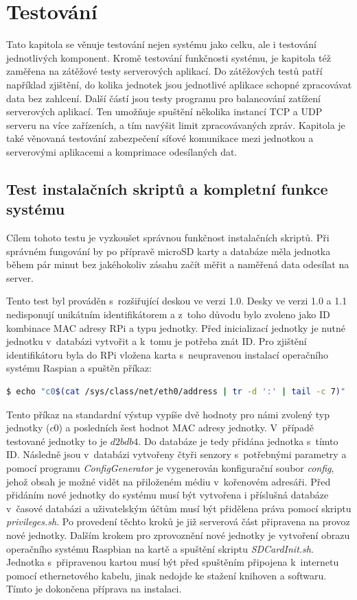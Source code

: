 \chapter{Testování}\label{kap:test}
Tato kapitola se věnuje testování nejen systému jako celku, ale i testování jednotlivých komponent. Kromě testování funkčnosti systému, je kapitola též zaměřena na zátěžové testy serverových aplikací. Do zátěžových testů patří například zjištění, do kolika jednotek jsou jednotlivé aplikace schopné zpracovávat data bez zahlcení. Další částí jsou testy programu pro balancování zatížení serverových aplikací. Ten umožňuje spuštění několika instancí TCP a UDP serveru na více zařízeních, a tím navýšit limit zpracovávaných zpráv. Kapitola je také věnovaná testování zabezpečení síťové komunikace mezi jednotkou a serverovými aplikacemi a komprimace odesílaných dat.

\section{Test instalačních skriptů a kompletní funkce systému}
Cílem tohoto testu je vyzkoušet správnou funkčnost instalačních skriptů. Při správném fungování by po přípravě microSD karty a databáze měla jednotka během pár minut bez jakéhokoliv zásahu začít měřit a naměřená data odesílat na server.

Tento test byl prováděn s~rozšiřující deskou ve verzi 1.0. Desky ve verzi 1.0 a 1.1 nedisponují unikátním identifikátorem a z~toho důvodu bylo zvoleno jako ID kombinace MAC adresy RPi a typu jednotky. Před inicializací jednotky je nutné jednotku v~databázi vytvořit a k~tomu je potřeba znát ID. Pro zjištění identifikátoru byla do RPi vložena karta s~neupravenou instalací operačního systému Raspian a spuštěn příkaz:
\begin{lstlisting}[language=bash, breaklines, label={code:uid}]
$ echo "c0$(cat /sys/class/net/eth0/address | tr -d ':' | tail -c 7)"
\end{lstlisting}
Tento příkaz na standardní výstup vypíše dvě hodnoty pro námi zvolený typ jednotky ($c0$) a posledních šest hodnot MAC adresy jednotky. V~případě testované jednotky to je $d2bdb4$. Do databáze je tedy přidána jednotka s~tímto ID. Následně jsou v~databázi vytvořeny čtyři senzory s~potřebnými parametry a pomocí programu \textit{ConfigGenerator} je vygenerován konfigurační soubor \textit{config}, jehož obsah je možné vidět na přiloženém médiu v~kořenovém adresáři. Před přidáním nové jednotky do systému musí být vytvořena i příslušná databáze v~časové databázi a uživatelským účtům musí být přidělena práva pomocí skriptu \textit{privileges.sh}. Po provedení těchto kroků je již serverová část připravena na provoz nové jednotky. Dalším krokem pro zprovoznění nové jednotky je vytvoření obrazu operačního systému Raspbian na kartě a spuštění skriptu \textit{SDCardInit.sh}. Jednotka s~připravenou kartou musí být před spuštěním připojena k~internetu pomocí ethernetového kabelu, jinak nedojde ke stažení knihoven a softwaru. Tímto je dokončena příprava na instalaci.


